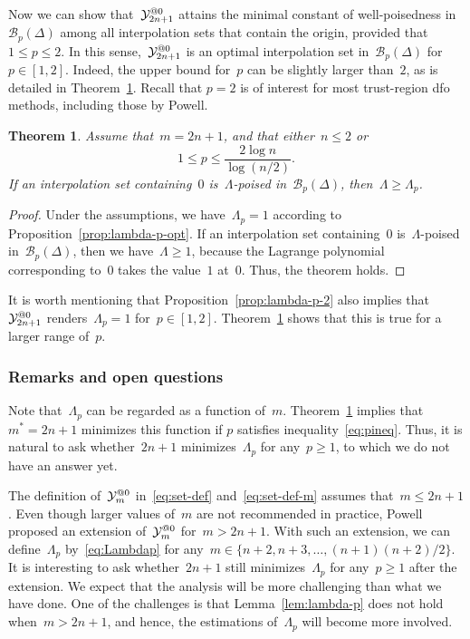 \documentclass{article}
\makeatletter
\newcounter{cite}
\numberwithin{equation}{section}
\theoremstyle{definition}
\theoremstyle{plain}
\newtheorem{theorem}{Theorem}[section]
\theoremstyle{remark}
\newcommand*{\set}[2][]{#1\{#2#1\}}
\newcommand*{\xpt}[1][]{\mathcal{Y}\ifblank{#1}{}{^{@#1}}}
\newcommand{\reviewed}[1]{\texorpdfstring{{\color{NavyBlue}#1}}{#1}}
\makeatother
\begin{document}
Now we can show that~$\xpt[0]_{2n + 1}$ attains the minimal constant of well-poisedness in~$\mathcal{B}_p(\Delta)$ among all interpolation sets that contain the origin, provided that~$1 \le p \le 2$.
In this sense,~$\xpt[0]_{2n + 1}$ is an optimal interpolation set in~$\mathcal{B}_p(\Delta)$ for~$p \in [1, 2]$.
Indeed, the upper bound for~$p$ can be slightly larger than~$2$, as is detailed in Theorem~\ref{thm:optimset}.
Recall that $p = 2$ is of interest for most trust-region \gls{dfo} methods, including those by Powell.

\begin{theorem}
    \label{thm:optimset}
    Assume that~$m = 2n + 1$, and that either~$n \le 2$ or
    \begin{equation}
        \label{eq:pineq}
        1 \le p \le \frac{2 \log n}{\log (n/2)}.
    \end{equation}
    If an interpolation set containing~$0$ is~$\Lambda$-poised in~$\mathcal{B}_p(\Delta)$, then~$\Lambda \ge \Lambda_p$.
\end{theorem}

\begin{proof}
    Under the assumptions, we have~$\Lambda_p = 1$ according to Proposition~\ref{prop:lambda-p-opt}.
    If an interpolation set containing~$0$ is~$\Lambda$-poised in~$\mathcal{B}_p(\Delta)$, then we
    have~$\Lambda \ge 1$, because the Lagrange polynomial corresponding to~$0$ takes the value~$1$ at~$0$.
    Thus, the theorem holds.
\end{proof}
It is worth mentioning that Proposition~\ref{prop:lambda-p-2} also implies that~$\xpt[0]_{2n + 1}$ renders~$\Lambda_p = 1$ for~$p \in [1, 2]$.
\reviewed{Theorem~\ref{thm:optimset} shows that this is true for a larger range of~$p$.}

\subsubsection{Remarks and open questions}

Note that~$\Lambda_p$ can be regarded as a function of~$m$.
Theorem~\ref{thm:optimset} implies that~$m^\ast = 2n + 1$ minimizes this function if $p$ satisfies inequality~\eqref{eq:pineq}.
Thus, it is natural to ask whether~$2n+1$ minimizes~$\Lambda_p$ for any~$p \ge 1$, to which we do not have an answer yet.

The definition of~$\xpt[0]_m$ in~\eqref{eq:set-def} and~\eqref{eq:set-def-m} assumes that~$m \le 2n + 1$.
Even though larger values of~$m$ are not recommended in practice, Powell~\cite{Powell_2006} proposed an extension of~$\xpt[0]_m$ for~$m > 2n + 1$.
With such an extension, we can define~$\Lambda_p$ by~\eqref{eq:Lambdap} for any~$m \in \set{n + 2, n +  3, \dots, (n + 1)(n + 2) / 2}$.
It is interesting to ask whether~$2n + 1$ still minimizes~$\Lambda_p$ for any~$p \ge 1$ after the extension.
We expect that the analysis will be more challenging than what we have done.
One of the challenges is that Lemma~\ref{lem:lambda-p} does not hold when~$m > 2n + 1$, and hence, the estimations of~$\Lambda_p$ will become more involved.
\end{document}
